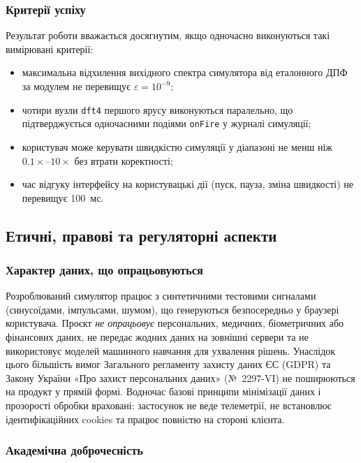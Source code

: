 \subsubsection*{Критерії успіху}

Результат роботи вважається досягнутим, якщо одночасно виконуються
такі вимірювані критерії:

\begin{itemize}
  \item максимальна відхилення вихідного спектра симулятора від
        еталонного ДПФ за модулем не перевищує $\varepsilon = 10^{-9}$;
  \item чотири вузли \texttt{dft4} першого ярусу виконуються
        паралельно, що підтверджується одночасними подіями
        \texttt{onFire} у журналі симуляції;
  \item користувач може керувати швидкістю симуляції у діапазоні
        не менш ніж $0.1\times$--$10\times$ без втрати коректності;
  \item час відгуку інтерфейсу на користувацькі дії (пуск, пауза,
        зміна швидкості) не перевищує 100~мс.
\end{itemize}


\subsection{Етичні, правові та регуляторні аспекти}

\subsubsection*{Характер даних, що опрацьовуються}

Розроблюваний симулятор працює з синтетичними тестовими сигналами
(синусоїдами, імпульсами, шумом), що генеруються безпосередньо у
браузері користувача. Проєкт \emph{не опрацьовує} персональних,
медичних, біометричних або фінансових даних, не передає жодних
даних на зовнішні сервери та не використовує моделей машинного
навчання для ухвалення рішень. Унаслідок цього більшість вимог
Загального регламенту захисту даних ЄС (GDPR) та Закону України
«Про захист персональних даних» (№~2297-VI) не поширюються на
продукт у прямій формі. Водночас базові принципи мінімізації даних
і прозорості обробки враховані: застосунок не веде телеметрії,
не встановлює ідентифікаційних cookies та працює повністю
на стороні клієнта.

\subsubsection*{Академічна доброчесність}


